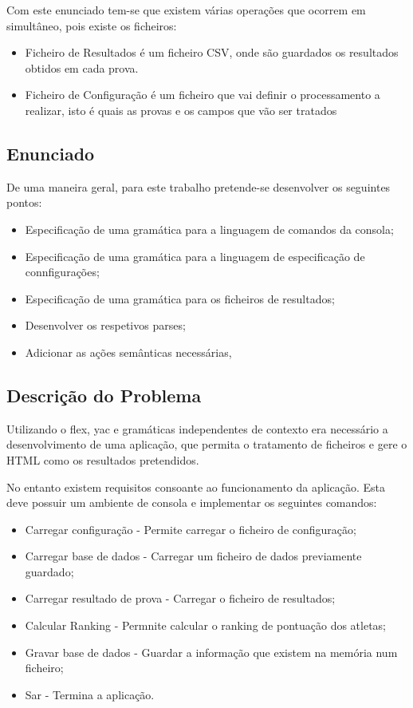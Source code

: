 \documentclass[11pt, a4paper, oneside]{article}
\begin{document}
Com este enunciado tem-se que existem várias operações que ocorrem em simultâneo, pois existe os ficheiros:
\begin{itemize}
\item Ficheiro de Resultados é um ficheiro CSV, onde são guardados os resultados obtidos em cada prova.

\item Ficheiro de Configuração é um ficheiro que vai definir o processamento a realizar, isto é quais as provas e os campos que vão ser tratados
\end{itemize}


\subsection{Enunciado}

De uma maneira geral, para este trabalho pretende-se desenvolver os seguintes pontos:

\begin{itemize}
\item Especificação de uma gramática para a linguagem de comandos da consola;
\item Especificação de uma gramática para a linguagem de especificação de connfigurações;
\item Especificação de uma gramática para os ficheiros de resultados;
\item Desenvolver os respetivos parses;
\item Adicionar as ações semânticas necessárias,
\end{itemize}


\subsection{Descrição do Problema}

Utilizando o flex, yac e gramáticas independentes de contexto era necessário a desenvolvimento de uma aplicação, que permita o tratamento de ficheiros e gere o HTML como os resultados pretendidos.

No entanto existem requisitos consoante ao funcionamento da aplicação. Esta deve possuir um ambiente de consola e implementar os seguintes comandos:
\begin{itemize}
\item Carregar configuração - Permite carregar o ficheiro de configuração;
\item Carregar base de dados - Carregar um ficheiro de dados previamente guardado;
\item Carregar resultado de prova - Carregar o ficheiro de resultados;
\item Calcular Ranking - Permnite calcular o ranking de pontuação dos atletas;
\item Gravar base de dados - Guardar a informação que existem na memória num ficheiro;
\item Sar -  Termina a aplicação.
\end{itemize}
\end{document}
